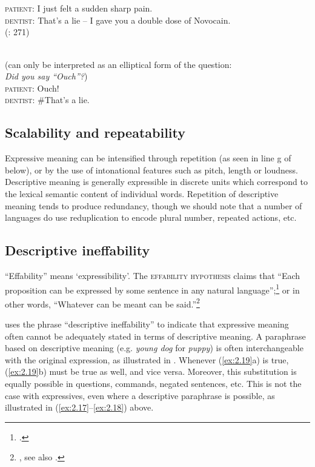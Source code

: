 \ea \label{ex:2.17}
\\
\\
\ex  \textsc{patient}:  {I just felt a sudden sharp pain.}\\
  \textsc{dentist}:  {That’s a lie – I gave you a double dose of Novocain.}\\
    (\citealt{Cruse1986}: 271)
\z
                       \z

\ea \label{ex:2.18}
\\
  (can only be interpreted as an elliptical form of the question:\\
     \textit{Did you say “Ouch”?})\\
\ex  \textsc{patient}:  {Ouch!}\\
  \textsc{dentist}: \#{That’s a lie.}
                       \z
\z

\subsection{Scalability and repeatability}\label{sec:2.6.4}

Expressive meaning can be intensified through repetition (as seen in line g of  below), or by the use of intonational features such as pitch, length or loudness. Descriptive meaning is generally expressible in discrete units which correspond to the lexical semantic content of individual words. Repetition of descriptive meaning tends to produce redundancy, though we should note that a number of languages do use reduplication to encode plural number, repeated actions, etc.


\subsection{Descriptive ineffability}\label{sec:2.6.5}

“Effability” means ‘expressibility’. The \textsc{effability hypothesis} claims that “Each proposition can be expressed by some sentence in any natural language”;\footnote{\citet[209]{Katz1978}.} or in other words, “Whatever can be meant can be said.”\footnote{\citet[18]{Searle1969}, see also \textcites[18--24]{Katz1972}[33]{Carston2002}.}



\citet{Potts2007c} uses the phrase “descriptive ineffability” to indicate that expressive meaning often cannot be adequately stated in terms of descriptive meaning. A paraphrase based on descriptive meaning (e.g. \textit{young dog} for \textit{puppy}) is often interchangeable with the original expression, as illustrated in . Whenever (\ref{ex:2.19}a) is true, (\ref{ex:2.19}b) must be true as well, and vice versa. Moreover, this substitution is equally possible in questions, commands, negated sentences, etc. This is not the case with expressives, even where a descriptive paraphrase is possible, as illustrated in (\ref{ex:2.17}--\ref{ex:2.18}) above.


